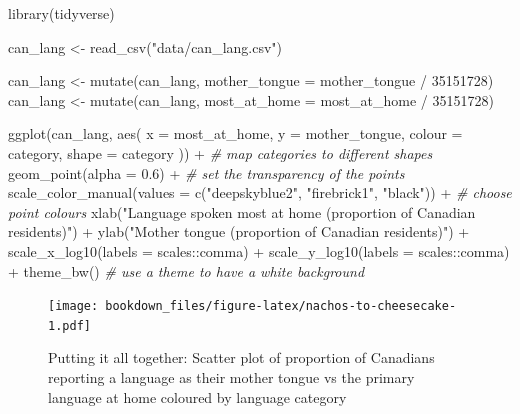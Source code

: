 \documentclass[
]{krantz}
\makeatletter
\newenvironment{Shaded}{\begin{snugshade}}{\end{snugshade}}
\newcommand{\AttributeTok}[1]{\textcolor[rgb]{0.61,0.61,0.61}{#1}}
\newcommand{\CommentTok}[1]{\textcolor[rgb]{0.37,0.37,0.37}{\textit{#1}}}
\newcommand{\DecValTok}[1]{\textcolor[rgb]{0.06,0.06,0.06}{#1}}
\newcommand{\FloatTok}[1]{\textcolor[rgb]{0.06,0.06,0.06}{#1}}
\newcommand{\FunctionTok}[1]{\textcolor[rgb]{0,0,0}{#1}}
\newcommand{\NormalTok}[1]{#1}
\newcommand{\OtherTok}[1]{\textcolor[rgb]{0.37,0.37,0.37}{#1}}
\newcommand{\SpecialCharTok}[1]{\textcolor[rgb]{0,0,0}{#1}}
\newcommand{\StringTok}[1]{\textcolor[rgb]{0.5,0.5,0.5}{#1}}
\newenvironment{kframe}{%
\medskip{}
\setlength{\fboxsep}{.8em}
 \def\at@end@of@kframe{}%
 \ifinner\ifhmode%
  \def\at@end@of@kframe{\end{minipage}}%
  \begin{minipage}{\columnwidth}%
 \fi\fi%
 \def\FrameCommand##1{\hskip\@totalleftmargin \hskip-\fboxsep
 \colorbox{shadecolor}{##1}\hskip-\fboxsep
     \hskip-\linewidth \hskip-\@totalleftmargin \hskip\columnwidth}%
 \MakeFramed {\advance\hsize-\width
   \@totalleftmargin\z@ \linewidth\hsize
   \@setminipage}}%
 {\par\unskip\endMakeFramed%
 \at@end@of@kframe}
\renewenvironment{Shaded}{\begin{kframe}}{\end{kframe}}
\makeatother
\begin{document}
\begin{Shaded}
\begin{Highlighting}[]
\FunctionTok{library}\NormalTok{(tidyverse)}

\NormalTok{can\_lang }\OtherTok{\textless{}{-}} \FunctionTok{read\_csv}\NormalTok{(}\StringTok{"data/can\_lang.csv"}\NormalTok{)}

\NormalTok{can\_lang }\OtherTok{\textless{}{-}} \FunctionTok{mutate}\NormalTok{(can\_lang, }\AttributeTok{mother\_tongue =}\NormalTok{ mother\_tongue }\SpecialCharTok{/} \DecValTok{35151728}\NormalTok{)}
\NormalTok{can\_lang }\OtherTok{\textless{}{-}} \FunctionTok{mutate}\NormalTok{(can\_lang, }\AttributeTok{most\_at\_home =}\NormalTok{ most\_at\_home }\SpecialCharTok{/} \DecValTok{35151728}\NormalTok{)}

\FunctionTok{ggplot}\NormalTok{(can\_lang, }\FunctionTok{aes}\NormalTok{(}
  \AttributeTok{x =}\NormalTok{ most\_at\_home,}
  \AttributeTok{y =}\NormalTok{ mother\_tongue,}
  \AttributeTok{colour =}\NormalTok{ category,}
  \AttributeTok{shape =}\NormalTok{ category}
\NormalTok{)) }\SpecialCharTok{+} \CommentTok{\# map categories to different shapes}
  \FunctionTok{geom\_point}\NormalTok{(}\AttributeTok{alpha =} \FloatTok{0.6}\NormalTok{) }\SpecialCharTok{+} \CommentTok{\# set the transparency of the points}
  \FunctionTok{scale\_color\_manual}\NormalTok{(}\AttributeTok{values =} \FunctionTok{c}\NormalTok{(}\StringTok{"deepskyblue2"}\NormalTok{, }\StringTok{"firebrick1"}\NormalTok{, }\StringTok{"black"}\NormalTok{)) }\SpecialCharTok{+} \CommentTok{\# choose point colours}
  \FunctionTok{xlab}\NormalTok{(}\StringTok{"Language spoken most at home (proportion of Canadian residents)"}\NormalTok{) }\SpecialCharTok{+}
  \FunctionTok{ylab}\NormalTok{(}\StringTok{"Mother tongue (proportion of Canadian residents)"}\NormalTok{) }\SpecialCharTok{+}
  \FunctionTok{scale\_x\_log10}\NormalTok{(}\AttributeTok{labels =}\NormalTok{ scales}\SpecialCharTok{::}\NormalTok{comma) }\SpecialCharTok{+}
  \FunctionTok{scale\_y\_log10}\NormalTok{(}\AttributeTok{labels =}\NormalTok{ scales}\SpecialCharTok{::}\NormalTok{comma) }\SpecialCharTok{+}
  \FunctionTok{theme\_bw}\NormalTok{() }\CommentTok{\# use a theme to have a white background}
\end{Highlighting}
\end{Shaded}

\begin{figure}
\centering
\texttt{[image: bookdown\_files/figure-latex/nachos-to-cheesecake-1.pdf]}
\caption{\label{fig:nachos-to-cheesecake}Putting it all together: Scatter plot of proportion of Canadians reporting a language as their mother tongue vs the primary language at home coloured by language category}
\end{figure}
\end{document}
